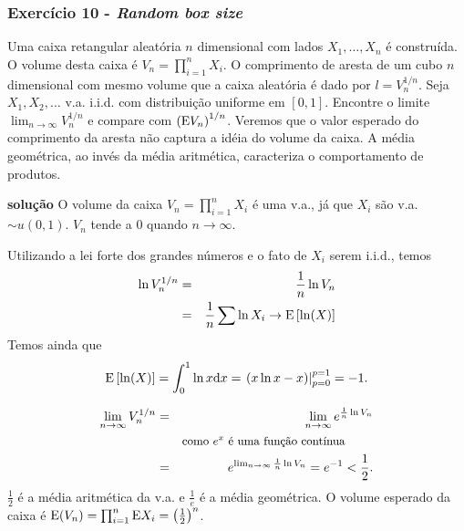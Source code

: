\begin{frame}[allowframebreaks]
  \frametitle{Exercício 10 - \textit{Random box size}}
  \begin{exercise}
  Uma caixa retangular aleatória $n$ dimensional com lados $X_1, \ldots, X_n$ é construída.
  O volume desta caixa é $V_n = \prod_{i=1}^{n} X_i$. O comprimento de aresta de um cubo 
  $n$ dimensional com mesmo volume que a caixa aleatória é dado por $l = V_n^{1/n}$.
  Seja $X_1, X_2, \ldots$ v.a. i.i.d. com distribuição uniforme em $[0,1]$.
  Encontre o limite $\lim_{n \rightarrow \infty} V_n^{1/n}$ e compare com $\left( \mathrm{E} V_n \right)^{1/n}$.
  Veremos que o valor esperado do comprimento da aresta não captura a idéia do volume da caixa.
  A média geométrica, ao invés da média aritmética, caracteriza o comportamento de produtos.

  \exercisebreak
  \textbf{solução} O volume da caixa $V_n = \prod_{i=1}^{n} X_i$ é uma v.a., já que $X_i$ são v.a.
  $\sim \mathit{u}(0,1)$. $V_n$ tende a $0$ quando $n \rightarrow \infty$.

  Utilizando a lei forte dos grandes números e o fato de $X_i$ serem i.i.d., temos
  \begin{eqnarray}
  \ln V_n^{1/n} &=& \frac{1}{n} \ln V_n \nonumber \\
	&=& \frac{1}{n} \sum \ln X_i \rightarrow \mathrm{E} \left[ \ln (X) \right]
  \end{eqnarray}
  \vspace{-1em}
  Temos ainda que
  \begin{equation}
  \mathrm{E} \left[ \ln (X) \right] = \int_0^1 \ln x \mathrm{d}x = \left. \left(x \ln x - x \right)\right|_{p=0}^{p=1} =  -1 .
  \end{equation}

  \exercisebreak
  \begin{eqnarray}
  \lim_{n \rightarrow \infty} V_n^{1/n} &=& \lim_{n \rightarrow \infty} e^{\frac{1}{n} \ln V_n} \nonumber \\
	&& \parbox{15em}{\small{como $e^x$ é uma função contínua}} \nonumber \\
	&=& e^{\lim_{n \rightarrow \infty} \frac{1}{n} \ln V_n} = e^{-1} < \frac{1}{2} .
  \end{eqnarray}
  $\frac{1}{2}$ é a média aritmética da v.a. e $\frac{1}{e}$ é a média geométrica.
  O volume esperado da caixa é $\mathrm{E}(V_n) = \prod_{i=1}^{n} \mathrm{E} X_i = \left(\frac{1}{2}\right)^n$.

  \end{exercise}
\end{frame}


